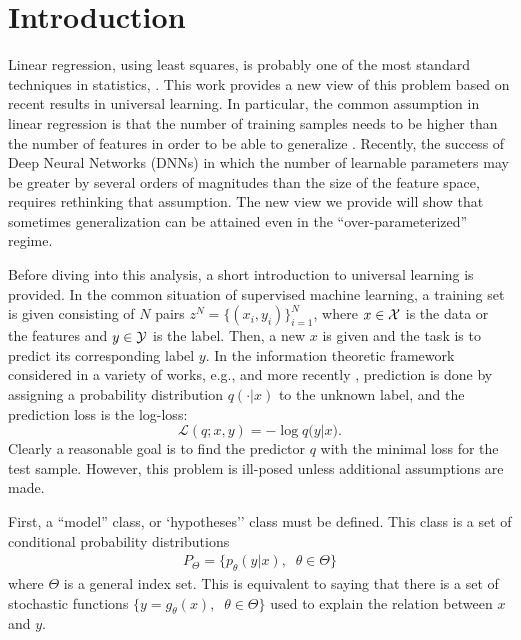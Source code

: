 \documentclass[conference,letterpaper]{IEEEtran}
\begin{document}

\section{Introduction} \label{Introduction}
Linear regression, using least squares, is probably one of the most standard techniques in statistics, \cite{lawson1995solving}. This work provides a new view of this problem based on recent results in universal learning. In particular, the common assumption in linear regression is that the number of training samples needs to be higher than the number of features in order to be able to generalize \cite{james2013introduction}.
Recently, the success of Deep Neural Networks (DNNs) in which the number of learnable parameters may be greater by several orders of magnitudes than the size of the feature space, requires rethinking that assumption. 
The new view we provide will show that sometimes generalization can be attained even in the ``over-parameterized'' regime.

Before diving into this analysis, a short introduction to universal learning is provided. In the common situation of supervised machine learning, a training set is given consisting of $N$ pairs $z^N=\{(x_i, y_i)\}_{i=1}^{N}$, where $x \in {\cal X}$ is the data or the features and $y \in {\cal Y}$ is the label. Then, a new $x$ is given and the task is to predict its corresponding label $y$. 
In the information theoretic framework considered in a variety of works, e.g., \cite{universal_prediction} and more recently \cite{FogelFeder2018}, prediction is done by assigning a probability distribution $q(\cdot|x)$ to the unknown label, and the prediction loss is the log-loss:
\begin{equation}
\mathcal{L}(q;x,y) = -\log {q(y|x}).
\end{equation}
Clearly a reasonable goal is to find the predictor $q$ with the minimal loss for the test sample. However, this problem is ill-posed unless additional assumptions are made.

First, a ``model'' class, or `hypotheses'' class must be defined. 
This class is a set of conditional probability distributions
\begin{align} P_\Theta = \{ p_\theta(y|x),\;\;\theta\in\Theta\} \end{align} 
where $\Theta$ is a general index set. 
This is equivalent to saying that there is a set of stochastic functions  $\{ y=g_\theta(x),\;\;\theta\in\Theta\}$ used to explain the relation between $x$ and $y$.
\end{document}
